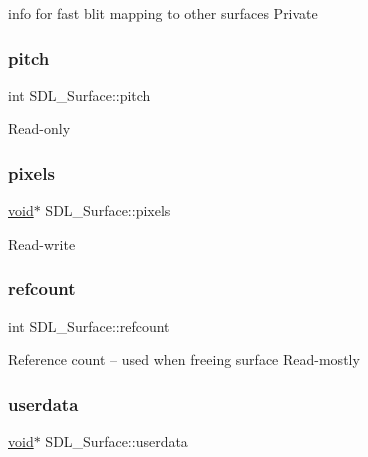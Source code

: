 info for fast blit mapping to other surfaces Private \mbox{\label{struct_s_d_l___surface_a5fa37325d77d65b2ed64ffc7cd01bb6c}} 
\subsubsection{\texorpdfstring{pitch}{pitch}}
{\footnotesize\ttfamily int S\+D\+L\+\_\+\+Surface\+::pitch}

Read-\/only \mbox{\label{struct_s_d_l___surface_abd9597e0e084b8ef33fe0397bc26d911}} 
\subsubsection{\texorpdfstring{pixels}{pixels}}
{\footnotesize\ttfamily \hyperlink{_s_d_l__opengles2__gl2ext_8h_ae5d8fa23ad07c48bb609509eae494c95}{void}$\ast$ S\+D\+L\+\_\+\+Surface\+::pixels}

Read-\/write \mbox{\label{struct_s_d_l___surface_a03d10628a359c0674f5ceffd574f1641}} 
\subsubsection{\texorpdfstring{refcount}{refcount}}
{\footnotesize\ttfamily int S\+D\+L\+\_\+\+Surface\+::refcount}

Reference count -- used when freeing surface Read-\/mostly \mbox{\label{struct_s_d_l___surface_ae66d973dcb9b57cb34815892e1ee1f31}} 
\subsubsection{\texorpdfstring{userdata}{userdata}}
{\footnotesize\ttfamily \hyperlink{_s_d_l__opengles2__gl2ext_8h_ae5d8fa23ad07c48bb609509eae494c95}{void}$\ast$ S\+D\+L\+\_\+\+Surface\+::userdata}

